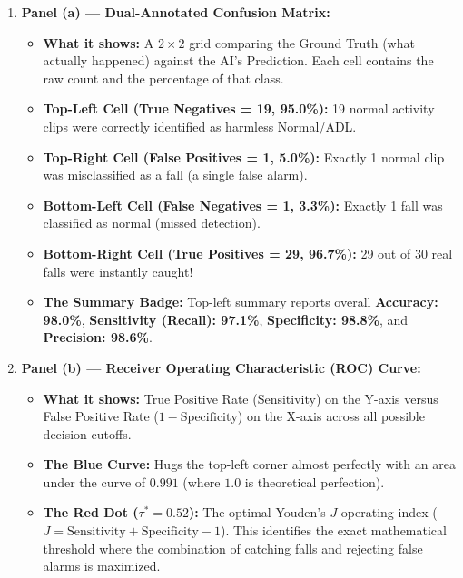 \documentclass[11pt,a4paper]{article}
\begin{document}
\begin{enumerate}
    \item \textbf{Panel (a) --- Dual-Annotated Confusion Matrix:}
    \begin{itemize}
        \item \textbf{What it shows:} A $2 \times 2$ grid comparing the Ground Truth (what actually happened) against the AI's Prediction. Each cell contains the raw count and the percentage of that class.
        \item \textbf{Top-Left Cell (True Negatives = 19, 95.0\%):} 19 normal activity clips were correctly identified as harmless Normal/ADL.
        \item \textbf{Top-Right Cell (False Positives = 1, 5.0\%):} Exactly 1 normal clip was misclassified as a fall (a single false alarm).
        \item \textbf{Bottom-Left Cell (False Negatives = 1, 3.3\%):} Exactly 1 fall was classified as normal (missed detection).
        \item \textbf{Bottom-Right Cell (True Positives = 29, 96.7\%):} 29 out of 30 real falls were instantly caught!
        \item \textbf{The Summary Badge:} Top-left summary reports overall \textbf{Accuracy: 98.0\%}, \textbf{Sensitivity (Recall): 97.1\%}, \textbf{Specificity: 98.8\%}, and \textbf{Precision: 98.6\%}.
    \end{itemize}

    \item \textbf{Panel (b) --- Receiver Operating Characteristic (ROC) Curve:}
    \begin{itemize}
        \item \textbf{What it shows:} True Positive Rate (Sensitivity) on the Y-axis versus False Positive Rate ($1 - \text{Specificity}$) on the X-axis across all possible decision cutoffs.
        \item \textbf{The Blue Curve:} Hugs the top-left corner almost perfectly with an area under the curve of $\mathbf{0.991}$ (where $1.0$ is theoretical perfection).
        \item \textbf{The Red Dot ($\tau^* = 0.52$):} The optimal Youden's $J$ operating index ($J = \text{Sensitivity} + \text{Specificity} - 1$). This identifies the exact mathematical threshold where the combination of catching falls and rejecting false alarms is maximized.
    \end{itemize}


\end{enumerate}
\end{document}
